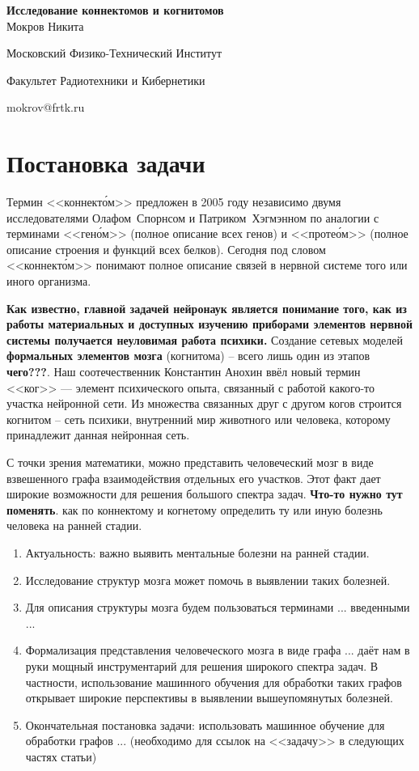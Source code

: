 \documentclass{urticle}
\begin{document}
\begin{center}
{\LARGE \textbf{Исследование коннектомов и когнитомов\\}}
\vspace{1cm}
{\Large Мокров Никита}

{\large Московский Физико-Технический Институт}

{\large Факультет Радиотехники и Кибернетики}

{\large mokrov@frtk.ru}
\end{center}

\section*{Постановка задачи}
Термин <<коннект\'{о}м>> предложен в 2005 году независимо двумя исследователями Олафом~Спорнсом и Патриком~Хэгмэнном по аналогии с терминами <<ген\'{о}м>> (полное описание всех генов) и <<проте\'{о}м>> (полное описание строения и функций всех белков). Сегодня под словом <<коннект\'{о}м>> понимают полное описание связей в нервной системе того или иного организма.

\textbf{Как известно, главной задачей нейронаук является понимание того, как из работы материальных и доступных изучению приборами элементов нервной системы получается неуловимая работа психики.} Создание сетевых моделей \textbf{формальных элементов мозга} (когнитома) -- всего лишь один из этапов \textbf{чего???}. Наш соотечественник Константин Анохин ввёл новый термин <<ког>> — элемент психического опыта, связанный с работой какого-то участка нейронной сети. Из множества связанных друг с другом когов строится когнитом -- сеть психики, внутренний мир животного или человека, которому принадлежит данная нейронная сеть.

С точки зрения математики, можно представить человеческий мозг в виде взвешенного графа взаимодействия отдельных его участков. Этот факт дает широкие возможности для решения большого спектра задач. \textbf{Что-то нужно тут поменять}. как по коннектому и когнетому определить ту или иную болезнь человека на ранней стадии.

\begin{enumerate}
	\item Актуальность: важно выявить ментальные болезни на ранней стадии.
	\item Исследование структур мозга может помочь в выявлении таких болезней.
	\item Для описания структуры мозга будем пользоваться терминами ... введенными ...
	\item Формализация представления человеческого мозга в виде графа ... даёт нам в руки мощный инструментарий для решения широкого спектра задач. В частности, использование машинного обучения для обработки таких графов открывает широкие перспективы в выявлении вышеупомянутых болезней.
	\item Окончательная постановка задачи: использовать машинное обучение для обработки графов ... (необходимо для ссылок на <<задачу>> в следующих частях статьи)
\end{enumerate}
\end{document}
